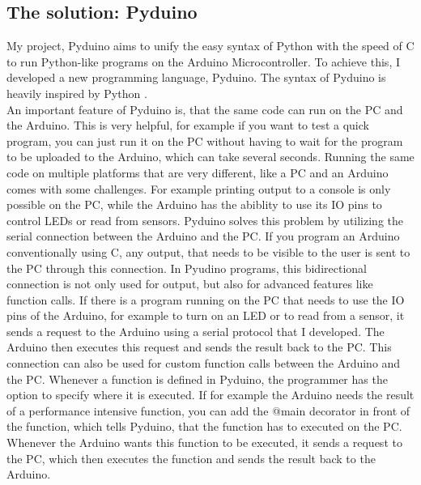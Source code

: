 \documentclass{article}
\begin{document}
\begin{multicols}{2}
\section{The solution: Pyduino}
\noindent My project, Pyduino aims to unify the easy syntax of Python with the speed of C to run Python-like programs on the Arduino Microcontroller. To achieve this, I developed a new programming language, Pyduino. The syntax of Pyduino is heavily inspired by Python \cite{Q2}. \\
An important feature of Pyduino is, that the same code can run on the PC and the Arduino. This is very helpful, for example if you want to test a quick program, you can just run it on the PC without having to wait for the program to be uploaded to the Arduino, which can take several seconds. Running the same code on multiple platforms that are very different, like a PC and an Arduino comes with some challenges. For example printing output to a console is only possible on the PC, while the Arduino has the abiblity to use its IO pins to control LEDs or read from sensors. Pyduino solves this problem by utilizing the serial connection between the Arduino and the PC. If you program an Arduino conventionally using C, any output, that needs to be visible to the user is sent to the PC through this connection. In Pyudino programs, this bidirectional connection is not only used for output, but also for advanced features like function calls. If there is a program running on the PC that needs to use the IO pins of the Arduino, for example to turn on an LED or to read from a sensor, it sends a request to the Arduino using a serial protocol that I developed. The Arduino then executes this request and sends the result back to the PC. This connection can also be used for custom function calls between the Arduino and the PC. Whenever a function is defined in Pyduino, the programmer has the option to specify where it is executed. If for example the Arduino needs the result of a performance intensive function, you can add the @main decorator in front of the function, which tells Pyduino, that the function has to executed on the PC. Whenever the Arduino wants this function to be executed, it sends a request to the PC, which then executes the function and sends the result back to the Arduino.\\

\end{multicols}
\end{document}
